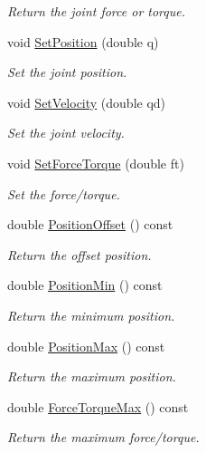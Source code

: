 \begin{DoxyCompactItemize}
\begin{DoxyCompactList}\small\item\em Return the joint force or torque. \end{DoxyCompactList}\item 
void \hyperlink{classrob_joint_a6de5b272b7e94f90db7a3fba6f729b6b}{Set\-Position} (double q)
\begin{DoxyCompactList}\small\item\em Set the joint position. \end{DoxyCompactList}\item 
void \hyperlink{classrob_joint_a9b9f7d88fe9bf54a5343d5143eda9267}{Set\-Velocity} (double qd)
\begin{DoxyCompactList}\small\item\em Set the joint velocity. \end{DoxyCompactList}\item 
void \hyperlink{classrob_joint_a863fa17f51425274496e92562c8b8c0b}{Set\-Force\-Torque} (double ft)
\begin{DoxyCompactList}\small\item\em Set the force/torque. \end{DoxyCompactList}\item 
double \hyperlink{classrob_joint_a5aeadbcac7ae0db2d8df7566f7398e5b}{Position\-Offset} () const 
\begin{DoxyCompactList}\small\item\em Return the offset position. \end{DoxyCompactList}\item 
double \hyperlink{classrob_joint_a82a39d2bfeb5bc91b36b95b7e537b317}{Position\-Min} () const 
\begin{DoxyCompactList}\small\item\em Return the minimum position. \end{DoxyCompactList}\item 
double \hyperlink{classrob_joint_a4a49b6789863b0e27658d6dbaa283dab}{Position\-Max} () const 
\begin{DoxyCompactList}\small\item\em Return the maximum position. \end{DoxyCompactList}\item 
double \hyperlink{classrob_joint_a368248c100fc00ed816374b97e5826ee}{Force\-Torque\-Max} () const 
\begin{DoxyCompactList}\small\item\em Return the maximum force/torque. \end{DoxyCompactList}\item 

\end{DoxyCompactItemize}
